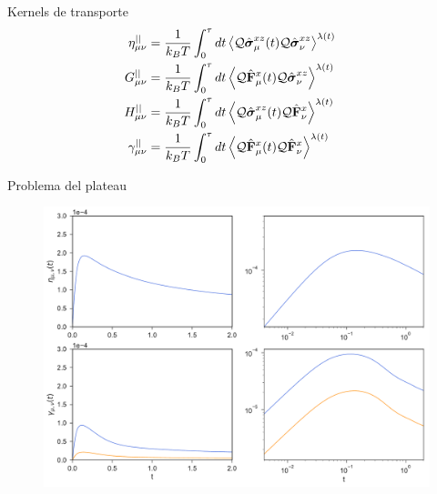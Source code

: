 \documentclass{beamer}
\begin{document}
\begin{frame}{Kernels de transporte}
\begin{align}
\eta^{||}_{\mu\nu}&
=\frac{1}{k_BT}\int_0^\tau  dt\left\langle 
{\cal Q}\hat{\boldsymbol{\sigma}}^{xz}_\mu(t){\cal Q}\hat{\boldsymbol{\sigma}}^{xz}_\nu
  \right\rangle^{\lambda(t)}&&
\nonumber\\
G^{||}_{\mu\nu}&
=\frac{1}{k_BT} \int_0^\tau  dt
\left\langle{\cal Q}\hat{\bf F}^{x}_\mu(t)
{\cal Q}\hat{\boldsymbol{\sigma}}^{xz}_\nu
\right\rangle^{\lambda(t)}&&
\nonumber\\
H^{||}_{\mu\nu}&
=\frac{1}{k_BT} 
\int_0^\tau  dt
\left\langle{\cal Q}\hat{\boldsymbol{\sigma}}^{xz}_\mu(t){\cal Q}\hat{\bf F}^{x}_\nu\right\rangle^{\lambda(t)}&&
\nonumber\\
\gamma^{||}_{\mu\nu}&=
\frac{1}{k_BT} \int_0^\tau  dt
\left\langle 
{\cal Q}\hat{\bf F}^{x}_\mu(t)
{\cal Q}\hat{\bf F}^{x}_\nu\right\rangle^{\lambda(t)}&&
\nonumber
\end{align}
\end{frame}


\begin{frame}{Problema del plateau}
\begin{figure}[]
  \includegraphics[scale=0.33]{NoPlateau-WALLS-17nodes}
\end{figure}
\end{frame}
\end{document}

